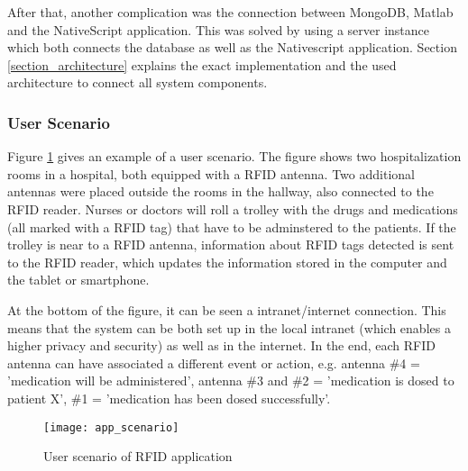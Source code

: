 After that, another complication was the connection between MongoDB, Matlab and the NativeScript application. This was solved by using a server instance which both connects the database as well as the Nativescript application. Section \ref{section_architecture} explains the exact implementation and the used architecture to connect all system components. 

\subsubsection{User Scenario}

Figure \ref{fig:appfunctionality} gives an example of a user scenario. The figure shows two hospitalization rooms in a hospital, both equipped with a RFID antenna. Two additional antennas were placed outside the rooms in the hallway, also connected to the RFID reader. Nurses or doctors will roll a trolley with the drugs and medications (all marked with a RFID tag) that have to be adminstered to the patients. If the trolley is near to a RFID antenna, information about RFID tags detected is sent to the RFID reader, which updates the information stored in the computer and the
tablet or smartphone.

At the bottom of the figure, it can be seen a intranet/internet connection. This means that the system can be both set up in the local intranet (which enables a higher privacy and security) as well as in the internet. In the end, each RFID antenna can have associated a different event or action, e.g. antenna \#4 = 'medication will be administered', antenna \#3 and \#2 = 'medication is dosed to patient X', \#1 = 'medication has been dosed successfully'.

\begin{figure}
\centering
\texttt{[image: app\_scenario]} 
\caption{\label{fig:appfunctionality}User scenario of RFID application} 
\end{figure}

